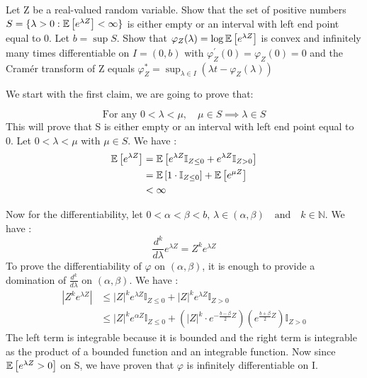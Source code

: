 \begin{exercise}[]{}
	Let Z be a real-valued random variable. Show that the set of positive numbers $ S=\{ \lambda >0 : \mathbb{E}\left[e^{\lambda Z}\right]<\infty \} $ is either empty or an interval with left end point equal to 0. Let $ b = \sup S $. Show that $ \varphi_Z(\lambda)=\log\mathbb{E}\left[e^{\lambda Z}\right] $ is convex and infinitely many times differentiable on $ I=(0,b) $ with $ \varphi^\prime_{Z}(0) = \varphi_Z(0) = 0 $ and the Cramér transform of Z equals $ \varphi_Z^{*} = \sup_{\lambda \in I}(\lambda t - \varphi_Z(\lambda)) $
\end{exercise}

\begin{solution}
	We start with the first claim, we are going to prove that:

\begin{equation*}
	\text{For any }  0 <  \lambda < \mu ,\quad\mu \in S \implies \lambda \in S
\end{equation*}
This will prove  that S is either empty or an interval with left end point equal to 0. Let $ 0<\lambda<\mu $ with $ \mu \in S $. We have :
\begin{align*}
	\mathbb{E}\left[e^{\lambda Z}\right] &= \mathbb{E}\left[e^{\lambda Z}\mathbb{I}_{Z \leq 0} + e^{\lambda Z}\mathbb{I}_{Z > 0}\right]\\
			   &= \mathbb{E}\left[1\cdot \mathbb{I}_{Z \leq 0}\right] + \mathbb{E}\left[e^{\mu Z}\right]\\
			   &< \infty
\end{align*}

Now for the differentiability, let $0<\alpha<\beta<b,\, \lambda \in (\alpha,\beta) \quad \text{and} \quad k\in \mathbb{N} $. We have :
\begin{equation*}
	\frac{d^{k}}{d \lambda}e^{\lambda Z} = Z^{k} e^{\lambda Z}
\end{equation*}
To prove the differentiability of $ \varphi $ on $ (\alpha,\beta) $, it is enough to provide a domination of $ \frac{d^{k}}{d \lambda}$ on $ (\alpha, \beta) $. We have : 
\begin{align*}
	|Z^{k}e^{\lambda Z}| &\leq |Z|^ke^{\lambda Z} \mathbb{I}_{Z \leq 0} + |Z|^ke^{\lambda Z} \mathbb{I}_{Z > 0} \\
			     &\leq |Z|^ke^{\alpha Z}\mathbb{I}_{Z \leq 0} + (|Z|^k\cdot e^{-\frac{b-\beta}{2}Z})(e^{\frac{b+\beta}{2}Z})\mathbb{I}_{Z>0}
\end{align*}
The left term is integrable because it is bounded and the right term is integrable as the product of a bounded function and an integrable function. Now since $ \mathbb{E}\left[e^{\lambda Z}>0\right] $ on S, we have proven that $ \varphi $ is infinitely differentiable on I.


\end{solution}
